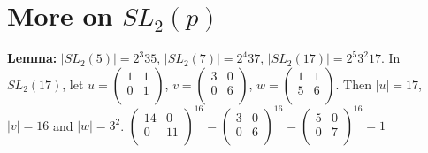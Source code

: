 \section {More on $SL_2(p)$}
{\bf Lemma:}
$|SL_2(5)|= 2^3 3 5$,
$|SL_2(7)|= 2^4 3 7$,
$|SL_2(17)|= 2^5 3^2 17$.  In $SL_2(17)$, let
$u= \left(
\begin{array}{cc}
1 &  1 \\
0 &  1\\
\end{array}
\right)$,
$v= \left(
\begin{array}{cc}
3 &  0 \\
0 &  6\\
\end{array}
\right)$,
$w= \left(
\begin{array}{cc}
1 &  1 \\
5 &  6\\
\end{array}
\right)$. Then $|u|=17$, $|v|=16$ and $|w|= 3^2$.
$
\left(
\begin{array}{cc}
14 &  0 \\
0 &  11\\
\end{array}
\right)^{16} =
\left(
\begin{array}{cc}
3 &  0 \\
0 &  6\\
\end{array}
\right)^{16} =
\left(
\begin{array}{cc}
5 &  0 \\
0 &  7\\
\end{array}
\right)^{16} = 1$
